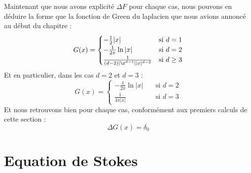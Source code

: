Maintenant que nous avons explicité $\Delta F$ pour chaque cas, nous pouvons en déduire la forme que
la fonction de Green du laplacien que nous avions annoncé au début du chapitre : 
$$ G(x) = 
\begin{cases}
    -\frac{1}{2}|x| \quad &\text{si } d = 1 \\
    -\frac{1}{2\pi} \ln|x| \quad &\text{si } d = 2 \\
    \frac{1}{(d-2) | \s^{d-1} | |x|^{d-2}} &\text{si } d \geq 3
\end{cases} $$
Et en particulier, dans les cas $d = 2$ et $d = 3$ : 
$$  G(x) = 
\begin{cases}
    -\frac{1}{2\pi} \ln|x| \quad &\text{si } d = 2 \\
    \frac{1}{4 \pi |x|} &\text{si } d = 3
\end{cases} $$
Et nous retrouvons bien pour chaque cas, conformément aux premiers calculs de cette section :
$$\Delta G(x) = \delta_0 $$

\vspace{1em}

\section{Equation de Stokes}


